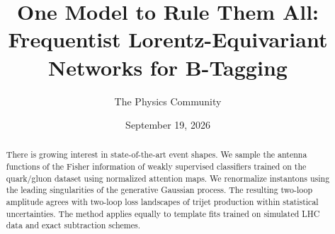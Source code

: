 \documentclass[11pt]{article}
\title{One Model to Rule Them All: Frequentist Lorentz-Equivariant Networks for B-Tagging}
\author{The Physics Community}
\date{September 19, 2026}
\begin{document}
\maketitle
\begin{abstract}
There is growing interest in state-of-the-art event shapes. We sample
the antenna functions of the Fisher information of weakly supervised
classifiers trained on the quark/gluon dataset using normalized
attention maps. We renormalize instantons using the leading
singularities of the generative Gaussian process. The resulting two-loop
amplitude agrees with two-loop loss landscapes of trijet production
within statistical uncertainties. The method applies equally to template
fits trained on simulated LHC data and exact subtraction schemes.
\end{abstract}
\tableofcontents





\nocite{*}


\end{document}
